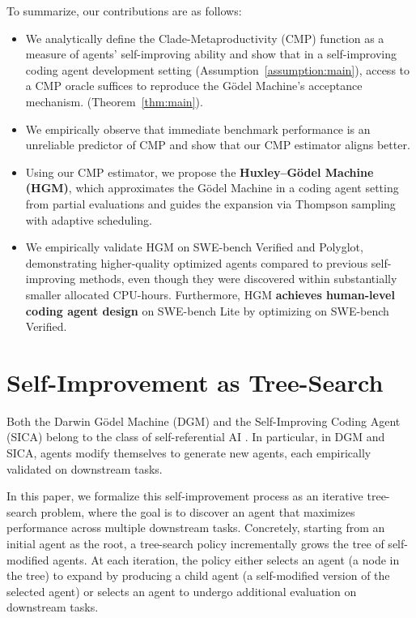 \documentclass{article}
\begin{document}
To summarize, our contributions are as follows: 
\begin{itemize}[leftmargin=*,topsep=0em,itemsep=0em]
    \item We analytically define the Clade-Metaproductivity ($\mathrm{CMP}$) function as a measure of agents' self-improving ability and show that in a self-improving coding agent development setting (Assumption~\ref{assumption:main}), access to a $\mathrm{CMP}$ oracle suffices to reproduce the G\"odel Machine’s acceptance mechanism. (Theorem~\ref{thm:main}).
    \item We empirically observe that immediate benchmark performance is an unreliable predictor of $\mathrm{CMP}$ and show that our $\mathrm{CMP}$ estimator aligns better.
    \item Using our $\mathrm{CMP}$ estimator, we propose the \textbf{Huxley–G\"odel Machine (HGM)}, which approximates the G\"odel Machine in a coding agent setting from partial evaluations and guides the expansion via Thompson sampling with adaptive scheduling.
    \item We empirically validate HGM on SWE-bench Verified and Polyglot, demonstrating higher-quality optimized agents compared to previous self-improving methods, even though they were discovered within substantially smaller allocated CPU-hours. Furthermore, HGM \textbf{achieves human-level coding agent design} on SWE-bench Lite by optimizing on SWE-bench Verified. 
\end{itemize}



\section{Self-Improvement as Tree-Search}\label{sec:self-improvement}
Both the Darwin G\"odel Machine (DGM) and the Self-Improving Coding Agent (SICA) belong to the class of self-referential AI \citep{Schmidhuber1987EvolutionaryPI,Schmidhuber:03gm}. In particular, in DGM and SICA, agents modify themselves to generate new agents, each empirically validated on downstream tasks. 

In this paper, we formalize this self-improvement process as an iterative tree-search problem, where the goal is to discover an agent that maximizes performance across multiple downstream tasks. Concretely, starting from an initial agent as the root, a tree-search policy incrementally grows the tree of self-modified agents. At each iteration, the policy either selects an agent (a node in the tree) to expand by producing a child agent (a self-modified version of the selected agent) or selects an agent to undergo additional evaluation on downstream tasks.
\end{document}
